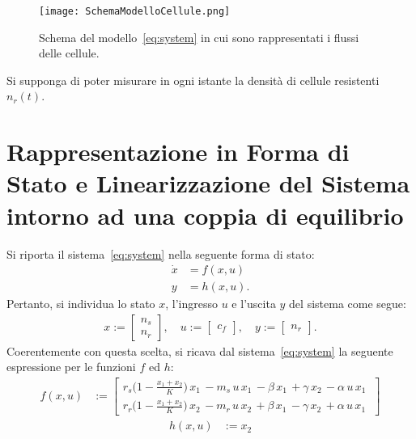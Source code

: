 \documentclass[a4paper, 11pt]{article}
\begin{document}
\begin{figure}[h!]
    \centering
    \texttt{[image: SchemaModelloCellule.png]}
    \caption{Schema del modello~\eqref{eq:system} in cui sono rappresentati i flussi delle cellule.}
    \label{fig:enter-label}
\end{figure}

Si supponga di poter misurare in ogni istante la densità di cellule resistenti $n_r(t)$.


\clearpage
\section{Rappresentazione in Forma di Stato e Linearizzazione del Sistema intorno ad una coppia di equilibrio}

Si riporta il sistema~\eqref{eq:system} nella seguente forma di stato:
%
\begin{subequations}
\begin{align}\label{eq:state_form}
	\dot{x} &= f(x,u)
	\\
	y &= h(x,u).
\end{align}
\end{subequations}
%
Pertanto, si individua lo stato $x$, l'ingresso $u$ e l'uscita $y$ del sistema come segue:
%
\begin{align*}
	x := \begin{bmatrix}
		n_s
		\\
		n_r
	\end{bmatrix}, \quad u := \begin{bmatrix}c_f\end{bmatrix}, \quad y := \begin{bmatrix}n_r\end{bmatrix}.
\end{align*}
%
Coerentemente con questa scelta, si ricava dal sistema~\eqref{eq:system} la seguente espressione per le funzioni $f$ ed $h$:
%
\begin{align*}
	f(x,u) &:=\begin{bmatrix}
		 r_s \bigl(1-\frac{x_1+x_2}{K}\bigr)\, x_1\, -m_s\, u\, x_1\, -\beta\, x_1\, +\gamma\, x_2\, -\alpha\, u\, x_1\ 
	\\
	r_r \bigl(1-\frac{x_1+x_2 }{K}\bigr)\, x_2\, -m_r\, u\, x_2\, +\beta\, x_1\, -\gamma\, x_2\, +\alpha\, u\, x_1\ 
	\end{bmatrix}
\end{align*}
\begin{align*}
	h(x,u) &:= x_2
\end{align*}
%
\end{document}
